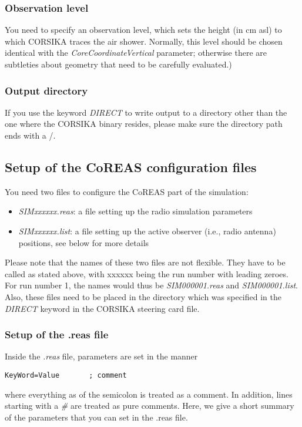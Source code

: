 \documentclass[a4paper,10pt]{article}
\begin{document}
\subsubsection{Observation level}
You need to specify an observation level, which sets the height (in cm asl) to which CORSIKA traces the air shower. Normally, this level should be chosen identical with the {\it CoreCoordinateVertical} parameter; otherwise there are subtleties about geometry that need to be carefully evaluated.)

\subsubsection{Output directory}
If you use the keyword {\it DIRECT} to write output to a directory other than the one where the CORSIKA binary resides, please make sure the directory path ends with a /.

\subsection{Setup of the CoREAS configuration files}

You need two files to configure the CoREAS part of the simulation:
%
\begin{itemize}
\item{{\it SIMxxxxxx.reas}: a file setting up the radio simulation parameters}
\item{{\it SIMxxxxxx.list}: a file setting up the active observer (i.e., radio antenna) positions, see below for more details}
\end{itemize}
%
Please note that the names of these two files are not flexible. They have to be called as stated above, with xxxxxx being the run number with leading zeroes. For run number 1, the names would thus be {\it SIM000001.reas} and {\it SIM000001.list}. Also, these files need to be placed in the directory which was specified in the {\it DIRECT} keyword in the CORSIKA steering card file.

\subsubsection{Setup of the .reas file}

Inside the {\it .reas} file, parameters are set in the manner
%
\begin{verbatim}
KeyWord=Value		; comment
\end{verbatim}
%
where everything as of the semicolon is treated as a comment. In addition, lines starting with a {\it \#} are treated as pure comments. Here, we give a short summary of the parameters that you can set in the .reas file.\\
\end{document}
